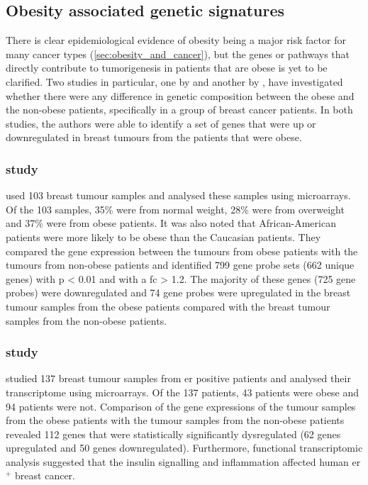 \subsection{Obesity associated genetic signatures}
\label{sub:obesity_associated_genetic_signatures}

There is clear epidemiological evidence of obesity being a major risk factor for many cancer types (\cref{sec:obesity_and_cancer}), but the genes or pathways that directly contribute to tumorigenesis in patients that are obese is yet to be clarified.
Two studies in particular, one by \citet{Creighton2012} and another by \citet{Fuentes-Mattei2014}, have investigated whether there were any difference in genetic composition between the obese and the non-obese patients, specifically in a group of breast cancer patients.
In both studies, the authors were able to identify a set of genes that were up or downregulated in breast tumours from the patients that were obese.

\subsubsection{\citet{Creighton2012} study}
\label{ssub:creighton_study}

\citet{Creighton2012} used 103 breast tumour samples and analysed these samples using microarrays.
Of the 103 samples, 35\% were from normal weight, 28\% were from overweight and 37\% were from obese patients.
It was also noted that African-American patients were more likely to be obese than the Caucasian patients.
They compared the gene expression between the tumours from obese patients with the tumours from non-obese patients and identified 799 gene probe sets (662 unique genes) with p \textless{} 0.01 and with a \gls{fc} \textgreater{} 1.2.
The majority of these genes (725 gene probes) were downregulated and 74 gene probes were upregulated in the breast tumour samples from the obese patients compared with the breast tumour samples from the non-obese patients.

\subsubsection{\citet{Fuentes-Mattei2014} study}
\label{ssub:fuentes_mattei_study}

\citet{Fuentes-Mattei2014} studied 137 breast tumour samples from \gls{er} positive patients and analysed their transcriptome using microarrays.
Of the 137 patients, 43 patients were obese and 94 patients were not.
Comparison of the gene expressions of the tumour samples from the obese patients with the tumour samples from the non-obese patients revealed 112 genes that were statistically significantly dysregulated (62 genes upregulated and 50 genes downregulated).
Furthermore, functional transcriptomic analysis suggested that the insulin signalling and inflammation affected human \gls{er}$^+$ breast cancer.

